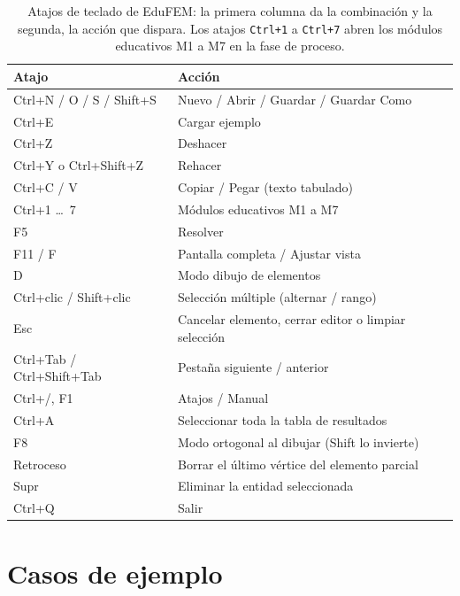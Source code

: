 \begin{table}[htbp]
\centering
\caption[Atajos de teclado de EduFEM.]{Atajos de teclado de EduFEM: la primera columna da la combinación y la segunda, la acción que dispara. Los atajos \texttt{Ctrl+1} a \texttt{Ctrl+7} abren los módulos educativos M1 a M7 en la fase de proceso.}
\label{tab:atajos}
\begin{tabular}{l l}
\hline
Atajo & Acción \\
\hline
Ctrl+N / O / S / Shift+S & Nuevo / Abrir / Guardar / Guardar Como \\
Ctrl+E                   & Cargar ejemplo \\
Ctrl+Z                   & Deshacer \\
Ctrl+Y o Ctrl+Shift+Z    & Rehacer \\
Ctrl+C / V               & Copiar / Pegar (texto tabulado) \\
Ctrl+1 \dots\ 7          & Módulos educativos M1 a M7 \\
F5                       & Resolver \\
F11 / F                  & Pantalla completa / Ajustar vista \\
D                        & Modo dibujo de elementos \\
Ctrl+clic / Shift+clic   & Selección múltiple (alternar / rango) \\
Esc                      & Cancelar elemento, cerrar editor o limpiar selección \\
Ctrl+Tab / Ctrl+Shift+Tab & Pestaña siguiente / anterior \\
Ctrl+/, F1               & Atajos / Manual \\
Ctrl+A                   & Seleccionar toda la tabla de resultados \\
F8                       & Modo ortogonal al dibujar (Shift lo invierte) \\
Retroceso                & Borrar el último vértice del elemento parcial \\
Supr                     & Eliminar la entidad seleccionada \\
Ctrl+Q                   & Salir \\
\hline
\end{tabular}
\end{table}

\section{Casos de ejemplo}

